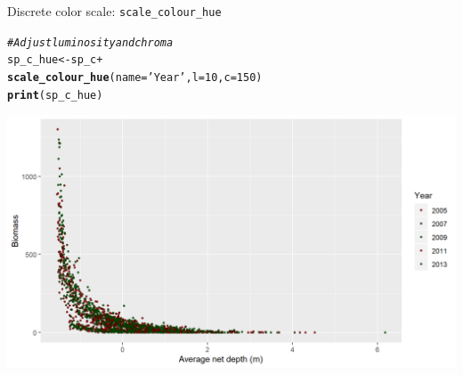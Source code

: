 \documentclass{beamer}\usepackage[]{graphicx}\usepackage[]{color}
\makeatletter
\newcommand{\hlnum}[1]{\textcolor[rgb]{0.686,0.059,0.569}{#1}}%
\newcommand{\hlstr}[1]{\textcolor[rgb]{0.192,0.494,0.8}{#1}}%
\newcommand{\hlcom}[1]{\textcolor[rgb]{0.678,0.584,0.686}{\textit{#1}}}%
\newcommand{\hlopt}[1]{\textcolor[rgb]{0,0,0}{#1}}%
\newcommand{\hlstd}[1]{\textcolor[rgb]{0.345,0.345,0.345}{#1}}%
\newcommand{\hlkwb}[1]{\textcolor[rgb]{0.69,0.353,0.396}{#1}}%
\newcommand{\hlkwc}[1]{\textcolor[rgb]{0.333,0.667,0.333}{#1}}%
\newcommand{\hlkwd}[1]{\textcolor[rgb]{0.737,0.353,0.396}{\textbf{#1}}}%
\newenvironment{kframe}{%
 \def\at@end@of@kframe{}%
 \ifinner\ifhmode%
  \def\at@end@of@kframe{\end{minipage}}%
  \begin{minipage}{\columnwidth}%
 \fi\fi%
 \def\FrameCommand##1{\hskip\@totalleftmargin \hskip-\fboxsep
 \colorbox{shadecolor}{##1}\hskip-\fboxsep
     \hskip-\linewidth \hskip-\@totalleftmargin \hskip\columnwidth}%
 \MakeFramed {\advance\hsize-\width
   \@totalleftmargin\z@ \linewidth\hsize
   \@setminipage}}%
 {\par\unskip\endMakeFramed%
 \at@end@of@kframe}
\newenvironment{knitrout}{}{} %
\makeatother
\begin{document}
\begin{frame}[fragile]{Discrete color scale: \lstinline{scale_colour_hue}}
\begin{knitrout}\footnotesize
{}\color{fgcolor}\begin{kframe}
\begin{alltt}
\hlcom{# Adjust luminosity and chroma}
\hlstd{sp_c_hue} \hlkwb{<-} \hlstd{sp_c} \hlopt{+}
  \hlkwd{scale_colour_hue}\hlstd{(}\hlkwc{name}\hlstd{=}\hlstr{'Year'}\hlstd{,} \hlkwc{l}\hlstd{=}\hlnum{10}\hlstd{,} \hlkwc{c}\hlstd{=}\hlnum{150}\hlstd{)}
\hlkwd{print}\hlstd{(sp_c_hue)}
\end{alltt}
\end{kframe}

{\centering \includegraphics[width=.9\linewidth]{figure/sp_discrete_color_hue2-1} 

}



\end{knitrout}
\end{frame}
\end{document}
